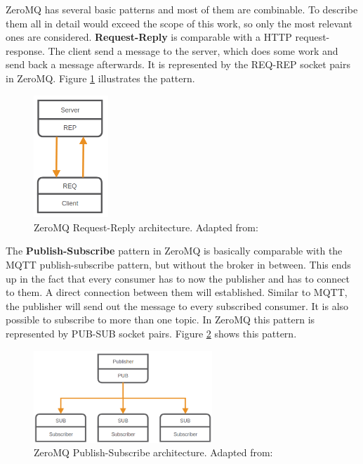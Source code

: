 ZeroMQ has several basic patterns and most of them are combinable.
To describe them all in detail would exceed the scope of this work, so only the most relevant ones are considered.\newline
\textbf{Request-Reply} is comparable with a \ac{HTTP} request-response.
The client send a message to the server, which does some work and send back a message afterwards.
It is represented by the REQ-REP socket pairs in ZeroMQ.
Figure \ref{fig:zeromq_req_rep} illustrates the pattern.\newline
\begin{figure}[H]
    \centering
    \includegraphics[width=0.25\textwidth]{resources/images/zeromq-req-rep.png}
    \caption[ZeroMQ Request-Reply architecture]{ZeroMQ Request-Reply architecture. Adapted from: \autocite{ZeroMQ:Guide}}
    \label{fig:zeromq_req_rep}
\end{figure}
The \textbf{Publish-Subscribe} pattern in ZeroMQ is basically comparable with the MQTT publish-subscribe pattern, but without the broker in between.
This ends up in the fact that every consumer has to now the publisher and has to connect to them.
A direct connection between them will established.
Similar to MQTT, the publisher will send out the message to every subscribed consumer.
It is also possible to subscribe to more than one topic.
In ZeroMQ this pattern is represented by PUB-SUB socket pairs.
Figure \ref{fig:zeromq_pub_sub} shows this pattern.
\begin{figure}[H]
    \centering
    \includegraphics[width=0.6\textwidth]{resources/images/zeromq-pub-sub.png}
    \caption[ZeroMQ Publish-Subscribe architecture]{ZeroMQ Publish-Subscribe architecture. Adapted from: \autocite{ZeroMQ:Guide}}
    \label{fig:zeromq_pub_sub}
\end{figure}
